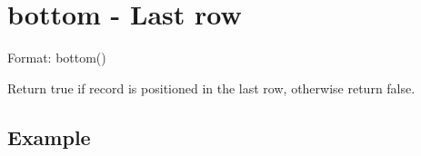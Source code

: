 
%

\section{bottom - Last row\label{sect:bottom}}

Format: bottom()

Return true if record is positioned in the last row, otherwise return false. 


\subsection*{Example}


%

